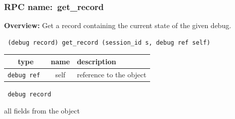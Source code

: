 \subsubsection{RPC name:~get\_record}

{\bf Overview:} 
Get a record containing the current state of the given debug.

\begin{verbatim} (debug record) get_record (session_id s, debug ref self)\end{verbatim}



 
\vspace{0.3cm}
\begin{tabular}{|c|c|p{7cm}|}
 \hline
{\bf type} & {\bf name} & {\bf description} \\ \hline
{\tt debug ref } & self & reference to the object \\ \hline 

\end{tabular}

\vspace{0.3cm}

{\tt 
debug record
}


all fields from the object
\vspace{0.3cm}
\vspace{0.3cm}
\vspace{0.3cm}

